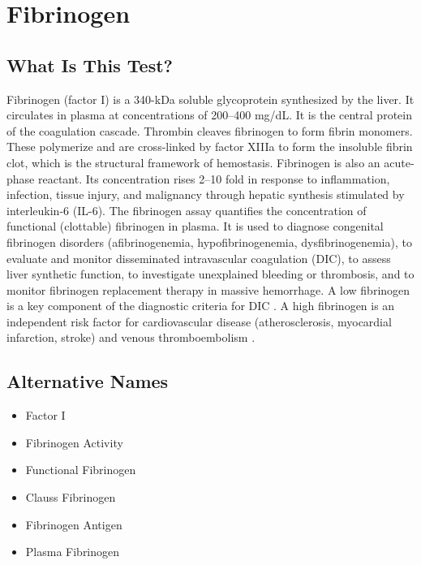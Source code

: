 \chapter{Fibrinogen}

\section*{What Is This Test?}
Fibrinogen (factor I) is a 340-kDa soluble glycoprotein synthesized by the liver. It circulates in plasma at concentrations of 200--400 mg/dL. It is the central protein of the coagulation cascade. Thrombin cleaves fibrinogen to form fibrin monomers. These polymerize and are cross-linked by factor XIIIa to form the insoluble fibrin clot, which is the structural framework of hemostasis. Fibrinogen is also an acute-phase reactant. Its concentration rises 2--10 fold in response to inflammation, infection, tissue injury, and malignancy through hepatic synthesis stimulated by interleukin-6 (IL-6). The fibrinogen assay quantifies the concentration of functional (clottable) fibrinogen in plasma. It is used to diagnose congenital fibrinogen disorders (afibrinogenemia, hypofibrinogenemia, dysfibrinogenemia), to evaluate and monitor disseminated intravascular coagulation (DIC), to assess liver synthetic function, to investigate unexplained bleeding or thrombosis, and to monitor fibrinogen replacement therapy in massive hemorrhage. A low fibrinogen is a key component of the diagnostic criteria for DIC \cite{levi1999disseminated}. A high fibrinogen is an independent risk factor for cardiovascular disease (atherosclerosis, myocardial infarction, stroke) and venous thromboembolism \cite{danesh2005plasma}.

\section*{Alternative Names}
\begin{itemize}
  \item Factor I
  \item Fibrinogen Activity
  \item Functional Fibrinogen
  \item Clauss Fibrinogen
  \item Fibrinogen Antigen
  \item Plasma Fibrinogen
\end{itemize}
